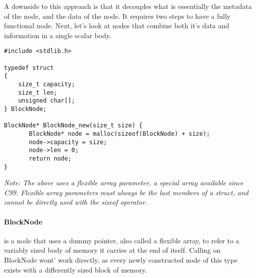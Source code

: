 \par A downside to this approach is that it decouples what is essentially the metadata of the node, and the data of the node. It requires two steps to have a fully functional node. Next, let's look at nodes that combine both it's data and information in a single scalar body. \\

\begin{lstlisting}[style=numc]
#include <stdlib.h>

typedef struct
{
    size_t capacity;
    size_t len;
    unsigned char[];
} BlockNode;

BlockNode* BlockNode_new(size_t size) {
       BlockNode* node = malloc(sizeof(BlockNode) + size);
       node->capacity = size;
       node->len = 0;
       return node;
}
\end{lstlisting}

\emph{Note: The above uses a flexible array parameter, a special array available since C99. Flexible array parameters must always be the last members of a struct, and cannot be directly used with the sizeof operator.}

\paragraph{BlockNode} is a node that uses a dummy pointer, also called a flexible array,  to refer to a variably sized body of memory it carries at the end of itself. Calling  on BlockNode wont' work directly, as every newly constructed node of this type exists with a differently sized block of memory.


